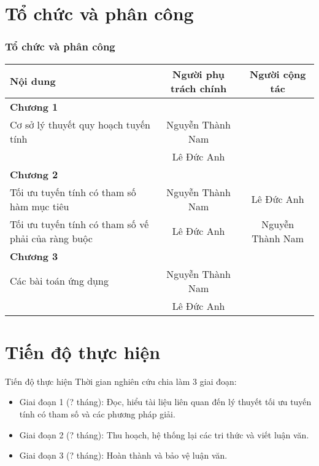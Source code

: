 \documentclass{beamer}
\begin{document}
\section{Tổ chức và phân công}
\begin{frame}[shrink=20]
    \frametitle{Tổ chức và phân công}
    \vspace{1.5cm}
    \begin{table}
        \begin{tabular}{|p{2.5in}|c|c|}
            \hline
            \textbf{Nội dung} & Người phụ trách chính & Người cộng tác \\
            \hline \hline
            \textbf{Chương 1} && \\
            \hline
            Cơ sở lý thuyết quy hoạch tuyến tính & Nguyễn Thành Nam & \\
            & Lê Đức Anh & \\
            \hline
            \textbf{Chương 2} && \\
            \hline
           Tối ưu tuyến tính có tham số hàm mục tiêu & Nguyễn Thành Nam & Lê Đức Anh \\
           \hline
           Tối ưu tuyến tính có tham số vế phải của ràng buộc & Lê Đức Anh & Nguyễn Thành Nam\\
            \hline
            \textbf{Chương 3} && \\
            \hline
            Các bài toán ứng dụng & Nguyễn Thành Nam & \\
            & Lê Đức Anh & \\
            \hline
        \end{tabular}
    \end{table}
\end{frame}
\section{Tiến độ thực hiện}
\begin{frame}{Tiến độ thực hiện}
Thời gian nghiên cứu chia làm 3 giai đoạn:
\begin{itemize}
\item Giai đoạn 1 (? tháng): Đọc, hiểu tài liệu liên quan đến lý thuyết tối ưu tuyến tính có tham số và các phương pháp giải.
\item Giai đoạn 2 (? tháng): Thu hoạch, hệ thống lại các tri thức và viết luận văn.
\item Giai đoạn 3 (? tháng): Hoàn thành và bảo vệ luận văn.
\end{itemize}
\end{frame}
\end{document}
